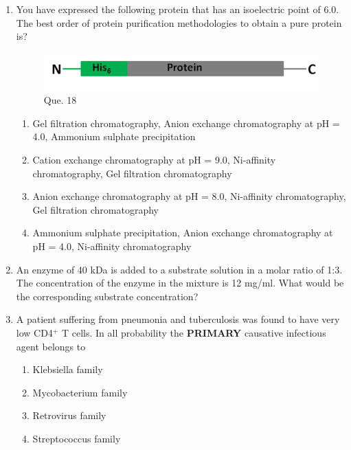 \documentclass[journal]{IEEEtran}
\begin{document}
\begin{enumerate}
\item You have expressed the following protein that has an isoelectric point of 6.0. The best order of protein purification methodologies to obtain a pure protein is?\hfill  \textit{}
\begin{figure}
    \includegraphics[width=0.5\columnwidth]{figs/Screenshot 2025-08-05 123543.png}
    \caption{Que. 18}
\end{figure}
\begin{enumerate}
    \item Gel filtration chromatography, Anion exchange chromatography at pH = 4.0, Ammonium sulphate precipitation
    \item Cation exchange chromatography at pH = 9.0, Ni-affinity chromatography, Gel filtration chromatography
    \item Anion exchange chromatography at pH = 8.0, Ni-affinity chromatography, Gel filtration chromatography
    \item Ammonium sulphate precipitation, Anion exchange chromatography at pH = 4.0, Ni-affinity chromatography
\end{enumerate}

\item An enzyme of 40 kDa is added to a substrate solution in a molar ratio of 1:3. The concentration of the enzyme in the mixture is 12 mg/ml. What would be the corresponding substrate concentration?\hfill  \textit{}
\begin{enumerate}
\end{enumerate}

\item A patient suffering from pneumonia and tuberculosis was found to have very low CD4$^+$ T cells. In all probability the \textbf{PRIMARY} causative infectious agent belongs to\hfill  \textit{}
\begin{enumerate}
    \item Klebsiella family
    \item Mycobacterium family
    \item Retrovirus family
    \item Streptococcus family
\end{enumerate}


\end{enumerate}
\end{document}
